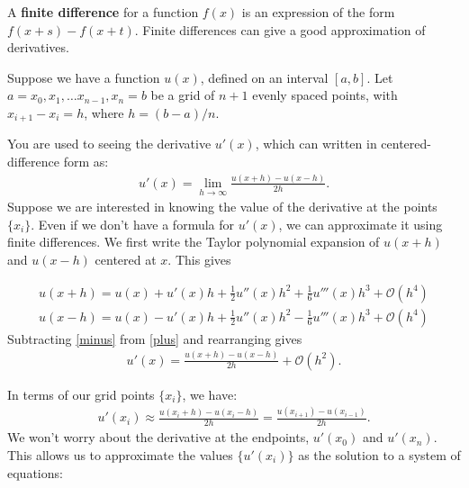 \label{lab:finitedifference2}


A \textbf{finite difference} for a function $f(x)$ is an expression of the form $f(x+s)-f(x+t)$.
Finite differences can give a good approximation of derivatives.

Suppose we have a function $u(x)$, defined on an interval $[a,b]$.
Let $a = x_0, x_1, \ldots x_{n-1}, x_n=b$ be a grid of $n+1$ evenly spaced points, with $x_{i+1}-x_i = h$, where $h = (b-a)/n$.

You are used to seeing the derivative $u'(x)$, which can written in centered-difference form as:
\begin{align*}
u'(x)=\lim_{h\to\infty}\frac{u(x+h)-u(x-h)}{2h}.
 \end{align*}
Suppose we are interested in knowing the value of the derivative at the points $\{x_i\}$. Even if we don't have a formula for $u'(x)$, we can approximate it using finite differences.
We first write the Taylor polynomial expansion of $u(x+h)$ and $u(x-h)$ centered at $x$. This gives

\begin{align}
u(x+h)=u(x)+u'(x)h+\frac{1}{2}u''(x)h^2+\frac{1}{6}u'''(x)h^3+\mathcal{O}(h^4)\label{plus}\\
u(x-h)=u(x)-u'(x)h+\frac{1}{2}u''(x)h^2-\frac{1}{6}u'''(x)h^3+\mathcal{O}(h^4)\label{minus}
\end{align}
Subtracting \eqref{minus} from \eqref{plus} and rearranging gives
\begin{align*}
u'(x)=\frac{u(x+h)-u(x-h)}{2h}+\mathcal{O}(h^2).
\end{align*}

In terms of our grid points $\{x_i\}$, we have:
\begin{align*}
u'(x_i) \approx \frac{u(x_i+h)-u(x_i-h)}{2h}=\frac{u(x_{i+1})-u(x_{i-1})}{2h}.
\end{align*}
We won't worry about the derivative at the endpoints, $u'(x_0)$ and $u'(x_n)$.
This allows us to approximate the values $\{u'(x_i)\}$ as the solution to a system of equations:


